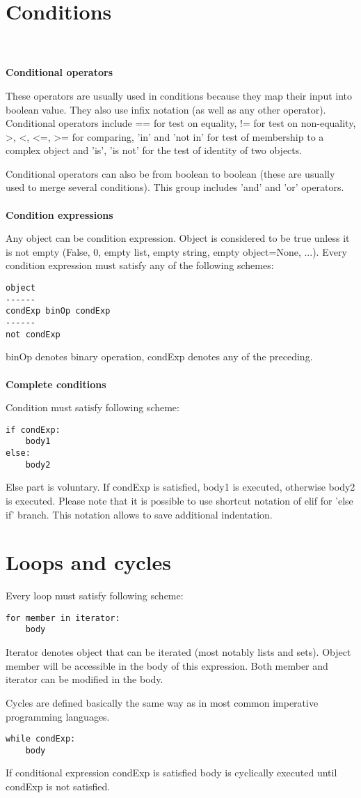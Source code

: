 \documentclass[11pt,oneside]{fithesis2}
\newcommand{\markit}[1]{\ \\\\{\noindent\textbf{#1}}}
\begin{document}
\section{Conditions}
\markit{Conditional operators}

These operators are usually used in conditions because they map their input into boolean value. They also use infix notation (as well as any other operator). Conditional operators include == for test on equality, != for test on non-equality, >, <, <=, >= for comparing, 'in' and 'not in' for test of membership to a complex object and 'is', 'is not' for the test of identity of two objects.

Conditional operators can also be from boolean to boolean (these are usually used to merge several conditions). This group includes 'and' and 'or' operators.
\markit{Condition expressions}

Any object can be condition expression. Object is considered to be true unless it is not empty (False, 0, empty list, empty string, empty object=None, ...). 
Every condition expression must satisfy any of the following schemes:

\begin{lstlisting}
object
------
condExp binOp condExp
------
not condExp
\end{lstlisting}
binOp denotes binary operation, condExp denotes any of the preceding.
\markit{Complete conditions}

Condition must satisfy following scheme:
\begin{lstlisting}
if condExp:
    body1
else:
    body2
\end{lstlisting}
Else part is voluntary. If condExp is satisfied, body1 is executed, otherwise body2 is executed. Please note that it is possible to use shortcut notation of elif for 'else if' branch. This notation allows to save additional indentation.

\section{Loops and cycles}
Every loop must satisfy following scheme:
\begin{lstlisting}
for member in iterator:
    body
\end{lstlisting}
Iterator denotes object that can be iterated (most notably lists and sets). Object member will be accessible in the body of this expression. Both member and iterator can be modified in the body.

Cycles are defined basically the same way as in most common imperative programming languages.
\begin{lstlisting}
while condExp:
    body
\end{lstlisting}
If conditional expression condExp is satisfied body is cyclically executed until condExp is not satisfied.
\end{document}
